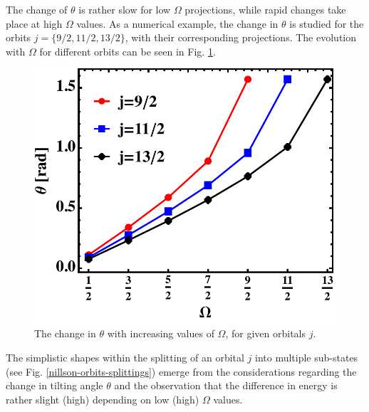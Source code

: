 The change of $\theta$ is rather slow for low $\Omega$ projections, while rapid changes take place at high $\Omega$ values. %
As a numerical example, the change in $\theta$ is studied for the orbits $j=\{9/2,11/2,13/2\}$, with their corresponding projections. The evolution with $\Omega$ for different orbits can be seen in Fig. \ref{fig-tilting-angle-shape}.

\begin{figure}
    \centering
    \includegraphics[scale=0.7]{Chapters/Figures/tilted_theta_shape.pdf}
    \caption{The change in $\theta$ with increasing values of $\Omega$, for given orbitals $j$.}
    \label{fig-tilting-angle-shape}
\end{figure}

The simplistic shapes within the splitting of an orbital $j$ into multiple sub-states (see Fig. \ref{nillson-orbits-splittings}) emerge from the considerations regarding the change in tilting angle $\theta$ and the observation that the difference in energy is rather slight (high) depending on low (high) $\Omega$ values.

